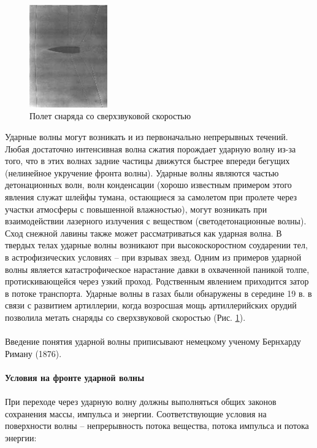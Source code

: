 \documentclass[14pt]{article}
\begin{document}
\begin{figure} %
    \centering
    \includegraphics[width=0.3\textwidth]{img/bullet.jpg}
    \caption{Полет снаряда со сверхзвуковой скоростью}
    \label{fig:bullet}
\end{figure}
\noindent Ударные волны могут возникать и из первоначально непрерывных течений. Любая достаточно интенсивная волна сжатия порождает ударную волну из-за того, что в этих волнах задние частицы движутся быстрее впереди бегущих (нелинейное укручение фронта волны).
Ударные волны являются частью детонационных волн, волн конденсации (хорошо известным примером этого явления служат шлейфы тумана, остающиеся за самолетом при пролете через участки атмосферы с повышенной влажностью), могут возникать при взаимодействии лазерного излучения с веществом (светодетонационные волны). Сход снежной лавины также может рассматриваться как ударная волна.
В твердых телах ударные волны возникают при высокоскоростном соударении тел, в астрофизических условиях – при взрывах звезд.
Одним из примеров ударной волны является катастрофическое нарастание давки в охваченной паникой толпе, протискивающейся через узкий проход. Родственным явлением приходится затор в потоке транспорта. Ударные волны в газах были обнаружены в середине 19 в. в связи с развитием артиллерии, когда возросшая мощь артиллерийских орудий позволила метать снаряды со сверхзвуковой скоростью (Рис. \ref{fig:bullet}).
\\ \\ Введение понятия ударной волны приписывают немецкому ученому Бернхарду Риману (1876).
\\ \\ \textbf{Условия на фронте ударной волны}
\\ \\ При переходе через ударную волну должны выполняться общих законов сохранения массы, импульса и энергии. Соответствующие условия на поверхности волны – непрерывность потока вещества, потока импульса и потока энергии:
\end{document}
